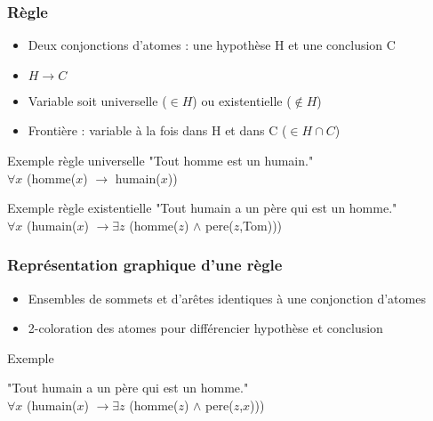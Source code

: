 \begin{frame}
	\frametitle{Règle}
	\begin{center}
	\begin{itemize}
		\item Deux conjonctions d'atomes : une hypothèse H et une conclusion C
		\item $H \rightarrow C$
		\item Variable soit universelle ($\in H$) ou existentielle ($\notin H$)
		\item Frontière : variable à la fois dans H et dans C ($\in H \cap C$)\\
	\end{itemize}

	\begin{exampleblock}{Exemple règle universelle}
		"Tout homme est un humain."\\
		$\forall x$ (homme($x$) $\rightarrow$ humain($x$))
	\end{exampleblock}

	\begin{exampleblock}{Exemple règle existentielle}
		"Tout humain a un père qui est un homme."\\
		$\forall x$ (humain($x$) $\rightarrow \exists z$ (homme($z$) $\wedge$ pere($z$,Tom)))
	\end{exampleblock}
	\end{center}
\end{frame}

\begin{frame}
	\frametitle{Représentation graphique d'une règle}
	\begin{center}
	\begin{itemize}
		\item Ensembles de sommets et d'arêtes identiques à une conjonction d'atomes
		\item 2-coloration des atomes pour différencier hypothèse et conclusion
	\end{itemize}
	\begin{exampleblock}{Exemple}
		\begin{center}
		"Tout humain a un père qui est un homme."\\
		$\forall x$ (humain($x$) $\rightarrow \exists z$ (homme($z$) $\wedge$
		pere($z$,$x$)))
		\end{center}
	\end{exampleblock}
	\end{center}
\end{frame}


